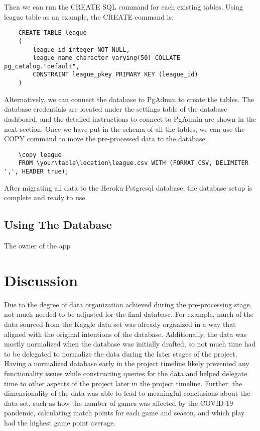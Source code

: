 Then we can run the CREATE SQL command for each existing tables. Using league table as an example, the CREATE command is:
\begin{verbatim}
    CREATE TABLE league
    (
        league_id integer NOT NULL,
        league_name character varying(50) COLLATE pg_catalog."default",
        CONSTRAINT league_pkey PRIMARY KEY (league_id)
    )
\end{verbatim}
Alternatively, we can connect the database to PgAdmin to create the tables. The database credentials are located under the settings table of the database dashboard, and the detailed instructions to connect to PgAdmin are shown in the next section. 
Once we have put in the schema of all the tables, we can use the COPY command to move the pre-processed data to the database:
\begin{verbatim}
    \copy league 
    FROM \your\table\location\league.csv WITH (FORMAT CSV, DELIMITER ',', HEADER true);
\end{verbatim}
After migrating all data to the Heroku Pstgresql database, the database setup is complete and ready to use.
\subsection{Using The Database}
The owner of the app 
\section{Discussion}
Due to the degree of data organization achieved during the pre-processing stage, not much needed to be adjusted for the final database. For example, much of the data sourced from the Kaggle data set was already organized in a way that aligned with the original intentions of the database. Additionally, the data was mostly normalized when the database was initially drafted, so not much time had to be delegated to normalize the data during the later stages of the project. Having a normalized database early in the project timeline likely prevented any functionality issues while constructing queries for the data and helped delegate time to other aspects of the project later in the project timeline. Further, the dimensionality of the data was able to lead to meaningful conclusions about the data set, such as how the number of games was affected by the COVID-19 pandemic, calculating match points for each game and season, and which play had the highest game point average. 

